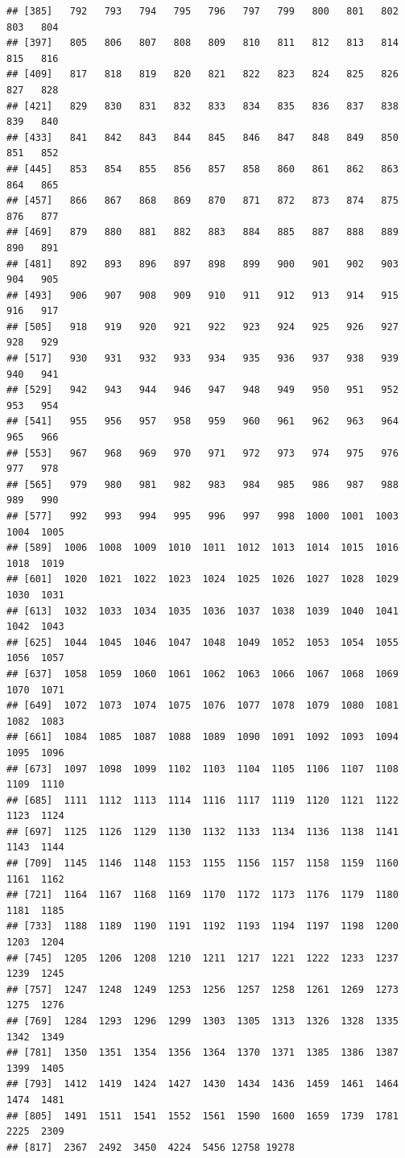 \documentclass[
]{article}
\begin{document}
\begin{verbatim}
## [385]   792   793   794   795   796   797   799   800   801   802   803   804
## [397]   805   806   807   808   809   810   811   812   813   814   815   816
## [409]   817   818   819   820   821   822   823   824   825   826   827   828
## [421]   829   830   831   832   833   834   835   836   837   838   839   840
## [433]   841   842   843   844   845   846   847   848   849   850   851   852
## [445]   853   854   855   856   857   858   860   861   862   863   864   865
## [457]   866   867   868   869   870   871   872   873   874   875   876   877
## [469]   879   880   881   882   883   884   885   887   888   889   890   891
## [481]   892   893   896   897   898   899   900   901   902   903   904   905
## [493]   906   907   908   909   910   911   912   913   914   915   916   917
## [505]   918   919   920   921   922   923   924   925   926   927   928   929
## [517]   930   931   932   933   934   935   936   937   938   939   940   941
## [529]   942   943   944   946   947   948   949   950   951   952   953   954
## [541]   955   956   957   958   959   960   961   962   963   964   965   966
## [553]   967   968   969   970   971   972   973   974   975   976   977   978
## [565]   979   980   981   982   983   984   985   986   987   988   989   990
## [577]   992   993   994   995   996   997   998  1000  1001  1003  1004  1005
## [589]  1006  1008  1009  1010  1011  1012  1013  1014  1015  1016  1018  1019
## [601]  1020  1021  1022  1023  1024  1025  1026  1027  1028  1029  1030  1031
## [613]  1032  1033  1034  1035  1036  1037  1038  1039  1040  1041  1042  1043
## [625]  1044  1045  1046  1047  1048  1049  1052  1053  1054  1055  1056  1057
## [637]  1058  1059  1060  1061  1062  1063  1066  1067  1068  1069  1070  1071
## [649]  1072  1073  1074  1075  1076  1077  1078  1079  1080  1081  1082  1083
## [661]  1084  1085  1087  1088  1089  1090  1091  1092  1093  1094  1095  1096
## [673]  1097  1098  1099  1102  1103  1104  1105  1106  1107  1108  1109  1110
## [685]  1111  1112  1113  1114  1116  1117  1119  1120  1121  1122  1123  1124
## [697]  1125  1126  1129  1130  1132  1133  1134  1136  1138  1141  1143  1144
## [709]  1145  1146  1148  1153  1155  1156  1157  1158  1159  1160  1161  1162
## [721]  1164  1167  1168  1169  1170  1172  1173  1176  1179  1180  1181  1185
## [733]  1188  1189  1190  1191  1192  1193  1194  1197  1198  1200  1203  1204
## [745]  1205  1206  1208  1210  1211  1217  1221  1222  1233  1237  1239  1245
## [757]  1247  1248  1249  1253  1256  1257  1258  1261  1269  1273  1275  1276
## [769]  1284  1293  1296  1299  1303  1305  1313  1326  1328  1335  1342  1349
## [781]  1350  1351  1354  1356  1364  1370  1371  1385  1386  1387  1399  1405
## [793]  1412  1419  1424  1427  1430  1434  1436  1459  1461  1464  1474  1481
## [805]  1491  1511  1541  1552  1561  1590  1600  1659  1739  1781  2225  2309
## [817]  2367  2492  3450  4224  5456 12758 19278
\end{verbatim}
\end{document}
